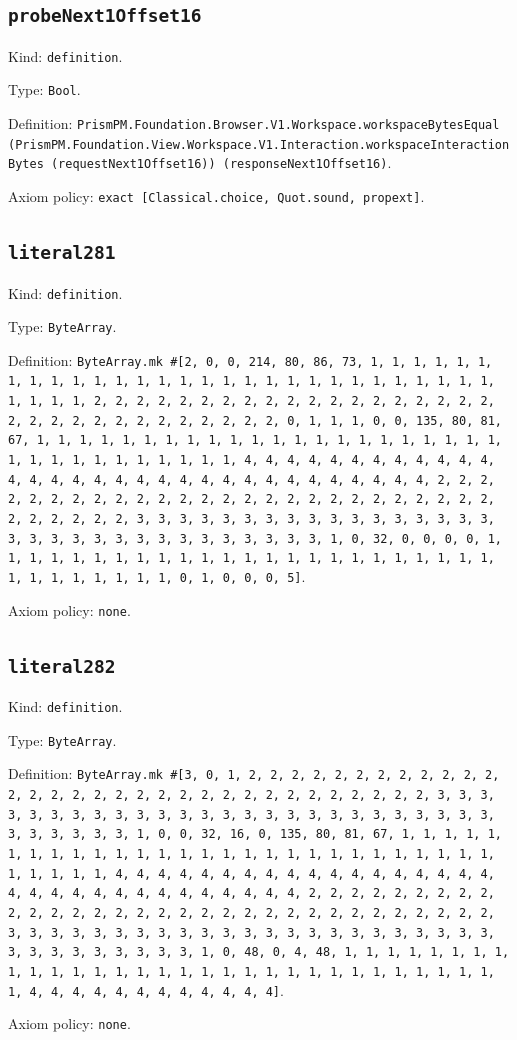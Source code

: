 \documentclass[11pt]{article}
\begin{document}
\subsection*{\texttt{probeNext1Offset16}}
\noindent Kind: \texttt{definition}.\par
\noindent Type: \texttt{Bool}.\par
\noindent Definition: \texttt{PrismPM.Foundation.Browser.V1.Workspace.workspaceBytesEqual (PrismPM.Foundation.View.Workspace.V1.Interaction.workspaceInteractionBytes (requestNext1Offset16)) (responseNext1Offset16)}.\par
\noindent Axiom policy: \texttt{exact [Classical.choice, Quot.sound, propext]}.\par
\subsection*{\texttt{literal281}}
\noindent Kind: \texttt{definition}.\par
\noindent Type: \texttt{ByteArray}.\par
\noindent Definition: \texttt{ByteArray.mk \#[2, 0, 0, 214, 80, 86, 73, 1, 1, 1, 1, 1, 1, 1, 1, 1, 1, 1, 1, 1, 1, 1, 1, 1, 1, 1, 1, 1, 1, 1, 1, 1, 1, 1, 1, 1, 1, 1, 1, 1, 2, 2, 2, 2, 2, 2, 2, 2, 2, 2, 2, 2, 2, 2, 2, 2, 2, 2, 2, 2, 2, 2, 2, 2, 2, 2, 2, 2, 2, 2, 2, 2, 0, 1, 1, 1, 0, 0, 135, 80, 81, 67, 1, 1, 1, 1, 1, 1, 1, 1, 1, 1, 1, 1, 1, 1, 1, 1, 1, 1, 1, 1, 1, 1, 1, 1, 1, 1, 1, 1, 1, 1, 1, 1, 1, 4, 4, 4, 4, 4, 4, 4, 4, 4, 4, 4, 4, 4, 4, 4, 4, 4, 4, 4, 4, 4, 4, 4, 4, 4, 4, 4, 4, 4, 4, 4, 4, 2, 2, 2, 2, 2, 2, 2, 2, 2, 2, 2, 2, 2, 2, 2, 2, 2, 2, 2, 2, 2, 2, 2, 2, 2, 2, 2, 2, 2, 2, 2, 2, 3, 3, 3, 3, 3, 3, 3, 3, 3, 3, 3, 3, 3, 3, 3, 3, 3, 3, 3, 3, 3, 3, 3, 3, 3, 3, 3, 3, 3, 3, 3, 3, 1, 0, 32, 0, 0, 0, 0, 1, 1, 1, 1, 1, 1, 1, 1, 1, 1, 1, 1, 1, 1, 1, 1, 1, 1, 1, 1, 1, 1, 1, 1, 1, 1, 1, 1, 1, 1, 1, 1, 0, 1, 0, 0, 0, 5]}.\par
\noindent Axiom policy: \texttt{none}.\par
\subsection*{\texttt{literal282}}
\noindent Kind: \texttt{definition}.\par
\noindent Type: \texttt{ByteArray}.\par
\noindent Definition: \texttt{ByteArray.mk \#[3, 0, 1, 2, 2, 2, 2, 2, 2, 2, 2, 2, 2, 2, 2, 2, 2, 2, 2, 2, 2, 2, 2, 2, 2, 2, 2, 2, 2, 2, 2, 2, 2, 2, 2, 3, 3, 3, 3, 3, 3, 3, 3, 3, 3, 3, 3, 3, 3, 3, 3, 3, 3, 3, 3, 3, 3, 3, 3, 3, 3, 3, 3, 3, 3, 3, 3, 1, 0, 0, 32, 16, 0, 135, 80, 81, 67, 1, 1, 1, 1, 1, 1, 1, 1, 1, 1, 1, 1, 1, 1, 1, 1, 1, 1, 1, 1, 1, 1, 1, 1, 1, 1, 1, 1, 1, 1, 1, 1, 1, 4, 4, 4, 4, 4, 4, 4, 4, 4, 4, 4, 4, 4, 4, 4, 4, 4, 4, 4, 4, 4, 4, 4, 4, 4, 4, 4, 4, 4, 4, 4, 4, 2, 2, 2, 2, 2, 2, 2, 2, 2, 2, 2, 2, 2, 2, 2, 2, 2, 2, 2, 2, 2, 2, 2, 2, 2, 2, 2, 2, 2, 2, 2, 2, 3, 3, 3, 3, 3, 3, 3, 3, 3, 3, 3, 3, 3, 3, 3, 3, 3, 3, 3, 3, 3, 3, 3, 3, 3, 3, 3, 3, 3, 3, 3, 3, 1, 0, 48, 0, 4, 48, 1, 1, 1, 1, 1, 1, 1, 1, 1, 1, 1, 1, 1, 1, 1, 1, 1, 1, 1, 1, 1, 1, 1, 1, 1, 1, 1, 1, 1, 1, 1, 1, 4, 4, 4, 4, 4, 4, 4, 4, 4, 4, 4, 4]}.\par
\noindent Axiom policy: \texttt{none}.\par
\end{document}
